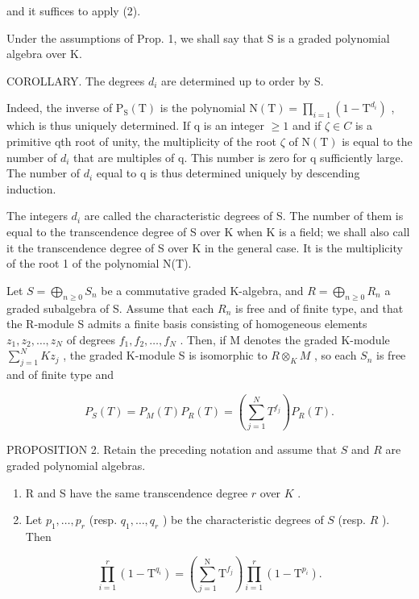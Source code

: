 and it suffices to apply (2).

Under the assumptions of Prop. 1, we shall say that S is a graded polynomial algebra over K.

COROLLARY. The degrees \(d_{i}\) are determined up to order by S.

Indeed, the inverse of \(\mathrm{P}_{\mathrm{S}}(\mathrm{T})\) is the polynomial \(\mathrm{N}(\mathrm{T}) = \prod_{i=1}(1 - \mathrm{T}^{d_i})\) , which is thus uniquely determined. If q is an integer \(\geqslant 1\) and if \(\zeta \in C\) is a primitive qth root of unity, the multiplicity of the root \(\zeta\) of \(\mathrm{N}(\mathrm{T})\) is equal to the number of \(d_{i}\) that are multiples of q. This number is zero for q sufficiently large. The number of \(d_{i}\) equal to q is thus determined uniquely by descending induction.

The integers \(d_{i}\) are called the characteristic degrees of S. The number of them is equal to the transcendence degree of S over K when K is a field; we shall also call it the transcendence degree of S over K in the general case. It is the multiplicity of the root 1 of the polynomial N(T).

Let \(S = \bigoplus_{n \geqslant 0} S_n\) be a commutative graded K-algebra, and \(R = \bigoplus_{n \geqslant 0} R_n\) a graded subalgebra of S. Assume that each \(R_n\) is free and of finite type, and that the R-module S admits a finite basis consisting of homogeneous elements \(z_1, z_2, \ldots, z_N\) of degrees \(f_1, f_2, \ldots, f_N\) . Then, if M denotes the graded K-module \(\sum_{j=1}^{N} Kz_j\) , the graded K-module S is isomorphic to \(R \otimes_K M\) , so each \(S_n\) is free and of finite type and

\[
P _ {S} (T) = P _ {M} (T) P _ {R} (T) = \left(\sum_ {j = 1} ^ {N} T ^ {f _ {j}}\right) P _ {R} (T).\tag{4}
\]

PROPOSITION 2. Retain the preceding notation and assume that \(S\) and \(R\) are graded polynomial algebras.

\begin{enumerate}
\def\labelenumi{(\roman{enumi})}
\item
  R and S have the same transcendence degree \(r\) over \(K\) .
\item
  Let \(p_1, \ldots, p_r\) (resp. \(q_1, \ldots, q_r\) ) be the characteristic degrees of \(S\) (resp. \(R\) ). Then
\end{enumerate}

\[
\prod_ {i = 1} ^ {r} \left(1 - \mathrm{T} ^ {q _ {i}}\right) = \left(\sum_ {j = 1} ^ {\mathrm{N}} \mathrm{T} ^ {f _ {j}}\right) \prod_ {i = 1} ^ {r} \left(1 - \mathrm{T} ^ {p _ {i}}\right).
\]

